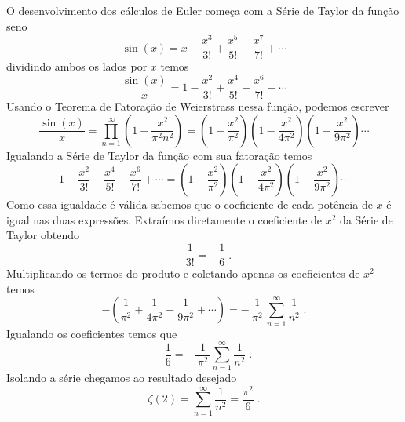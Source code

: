 O desenvolvimento dos cálculos de Euler começa com a Série de Taylor da função seno
\[
  \sin(x) = x
          - \frac{x^3}{3!}
          + \frac{x^5}{5!}
          - \frac{x^7}{7!}
          + \cdots
\]
dividindo ambos os lados por $x$ temos
\[
  \frac{\sin(x)}{x} = 1
                    - \frac{x^2}{3!}
                    + \frac{x^4}{5!}
                    - \frac{x^6}{7!}
                    + \cdots
\]
Usando o Teorema de Fatoração de Weierstrass nessa função, podemos escrever
\[
  \frac{\sin(x)}{x} = \prod_{n=1}^{\infty} \left(1-\frac{x^2}{\pi^2n^2}\right)
                    = \left(1-\frac{x^2}{ \pi^2}\right)
                      \left(1-\frac{x^2}{4\pi^2}\right)
                      \left(1-\frac{x^2}{9\pi^2}\right)
                      \cdots
\]
Igualando a Série de Taylor da função com sua fatoração temos
\begin{equation}
  \label{eq:fatoracao_seno}
  1
  - \frac{x^2}{3!}
  + \frac{x^4}{5!}
  - \frac{x^6}{7!}
  + \cdots
  = \left(1-\frac{x^2}{ \pi^2}\right)
    \left(1-\frac{x^2}{4\pi^2}\right)
    \left(1-\frac{x^2}{9\pi^2}\right)
    \cdots
\end{equation}
Como essa igualdade é válida sabemos que o coeficiente de cada potência
de $x$ é igual nas duas expressões.
Extraímos diretamente o coeficiente de $x^2$ da Série de Taylor
obtendo
\[
  -\frac{1}{3!} = -\frac{1}{6}    \;.
\]
Multiplicando os termos do produto e coletando apenas os
coeficientes de $x^2$ temos
\[
  -\left( \frac{1}{ \pi^2}
        + \frac{1}{4\pi^2}
        + \frac{1}{9\pi^2}
        + \cdots
  \right)
  = - \frac{1}{\,\pi^2\,} \sum_{n=1}^\infty \frac{1}{n^2}    \;.
\]
Igualando os coeficientes temos que
\[
  - \frac{1}{6}
  = - \frac{1}{\,\pi^2\,} \sum_{n=1}^\infty \frac{1}{n^2}    \;.
\]
Isolando a série chegamos ao resultado desejado
\[
  \zeta(2) = \sum_{n=1}^\infty \frac{1}{n^2} = \frac{\pi^2}{6}    \;.
\]


